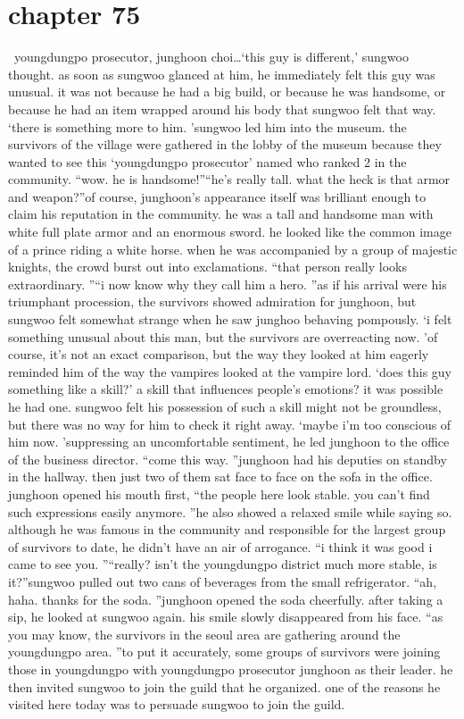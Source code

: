 \section{chapter 75}






 youngdungpo prosecutor, junghoon choi…‘this guy is different,’ sungwoo thought.
as soon as sungwoo glanced at him, he immediately felt this guy was unusual.
it was not because he had a big build, or because he was handsome, or because he had an item wrapped around his body that sungwoo felt that way.
‘there is something more to him.
’sungwoo led him into the museum.
 the survivors of the village were gathered in the lobby of the museum because they wanted to see this ‘youngdungpo prosecutor’ named who ranked 2 in the community.
“wow.
 he is handsome!”“he’s really tall.
 what the heck is that armor and weapon?”of course, junghoon’s appearance itself was brilliant enough to claim his reputation in the community.
he was a tall and handsome man with white full plate armor and an enormous sword.
 he looked like the common image of a prince riding a white horse.
when he was accompanied by a group of majestic knights, the crowd burst out into exclamations.
“that person really looks extraordinary.
”“i now know why they call him a hero.
”as if his arrival were his triumphant procession, the survivors showed admiration for junghoon, but sungwoo felt somewhat strange when he saw junghoo behaving pompously.
‘i felt something unusual about this man, but the survivors are overreacting now.
’of course, it’s not an exact comparison, but the way they looked at him eagerly reminded him of the way the vampires looked at the vampire lord.
‘does this guy something like a skill?’
a skill that influences people’s emotions? it was possible he had one.
 sungwoo felt his possession of such a skill might not be groundless, but there was no way for him to check it right away.
‘maybe i’m too conscious of him now.
’suppressing an uncomfortable sentiment, he led junghoon to the office of the business director.
“come this way.
”junghoon had his deputies on standby in the hallway.
 then just two of them sat face to face on the sofa in the office.
junghoon opened his mouth first, “the people here look stable.
 you can’t find such expressions easily anymore.
”he also showed a relaxed smile while saying so.
although he was famous in the community and responsible for the largest group of survivors to date, he didn’t have an air of arrogance.
“i think it was good i came to see you.
”“really? isn’t the youngdungpo district much more stable, is it?”sungwoo pulled out two cans of beverages from the small refrigerator.
“ah, haha.
 thanks for the soda.
”junghoon opened the soda cheerfully.
 after taking a sip, he looked at sungwoo again.
his smile slowly disappeared from his face.
“as you may know, the survivors in the seoul area are gathering around the youngdungpo area.
”to put it accurately, some groups of survivors were joining those in youngdungpo with youngdungpo prosecutor junghoon as their leader.
he then invited sungwoo to join the guild that he organized.
 one of the reasons he visited here today was to persuade sungwoo to join the guild.

